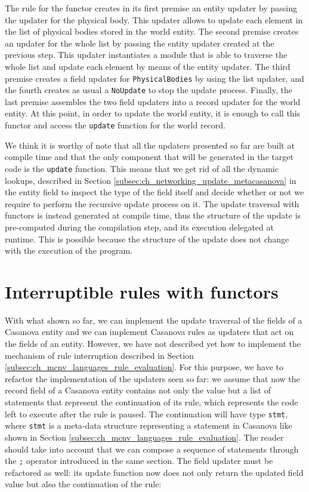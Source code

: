 \noindent
The rule for the functor creates in its first premise an entity updater by passing the updater for the physical body. This updater allows to update each element in the list of physical bodies stored in the world entity. The second premise creates an updater for the whole list by passing the entity updater created at the previous step. This updater instantiates a module that is able to traverse the whole list and update each element by means of the entity updater. The third premise creates a field updater for \texttt{PhysicalBodies} by using the list updater, and the fourth creates as usual a \texttt{NoUpdate} to stop the update process. Finally, the last premise assembles the two field updaters into a record updater for the world entity. At this point, in order to update the world entity, it is enough to call this functor and access the \texttt{update} function for the world record.

We think it is worthy of note that all the updaters presented so far are built at compile time and that the only component that will be generated in the target code is the \texttt{update} function. This means that we get rid of all the dynamic lookups, described in Section \ref{subsec:ch_networking_update_metacasanova} in the entity field to inspect the type of the field itself and decide whether or not we require to perform the recursive update process on it. The update traversal with functors is instead generated at compile time, thus the structure of the update is pre-computed during the compilation step, and its execution delegated at runtime. This is possible because the structure of the update does not change with the execution of the program.

\section{Interruptible rules with functors}
\label{subsec:ch_networking_interruptible_rules}
With what shown so far, we can implement the update traversal of the fields of a Casanova entity and we can implement Casanova rules as updaters that act on the fields of an entity. However, we have not described yet how to implement the mechanism of rule interruption described in Section \ref{subsec:ch_mcnv_languages_rule_evaluation}. For this purpose, we have to refactor the implementation of the updaters seen so far: we assume that now the record field of a Casanova entity contains not only the value but a list of statements that represent the continuation of its rule, which represents the code left to execute after the rule is paused. The continuation will have type \texttt{stmt}, where \texttt{stmt} is a meta-data structure representing a statement in Casanova like shown in Section \ref{subsec:ch_mcnv_languages_rule_evaluation}. The reader should take into account that we can compose a sequence of statements through the \texttt{;} operator introduced in the same section. The field updater must be refactored as well: its update function now does not only return the updated field value but also the continuation of the rule:


